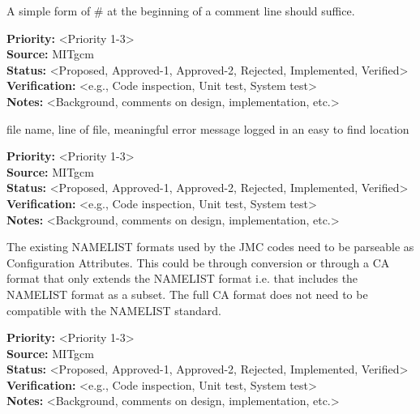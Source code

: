 



A simple form of # at the beginning of a comment line
should suffice.

\begin{reqlist}
{\bf Priority:} <Priority 1-3> \\
{\bf Source:} MITgcm \\
{\bf Status:} <Proposed, Approved-1, Approved-2, Rejected, Implemented, Verified> \\
{\bf Verification:} <e.g., Code inspection, Unit test, System test> \\
{\bf Notes:} <Background, comments on design, implementation, etc.> 
\end{reqlist}

file name, line of file, meaningful error message logged in an easy
to find location

\begin{reqlist}
{\bf Priority:} <Priority 1-3> \\
{\bf Source:} MITgcm \\
{\bf Status:} <Proposed, Approved-1, Approved-2, Rejected, Implemented, Verified> \\
{\bf Verification:} <e.g., Code inspection, Unit test, System test> \\
{\bf Notes:} <Background, comments on design, implementation, etc.> 
\end{reqlist}

The existing NAMELIST formats used by the JMC codes need to be parseable
as Configuration Attributes. This could be through conversion or through
a CA format that only extends the NAMELIST format i.e. that includes the
NAMELIST format as a subset.
The full CA format does not need to be compatible with the NAMELIST standard.
\begin{reqlist}
{\bf Priority:} <Priority 1-3> \\
{\bf Source:} MITgcm \\
{\bf Status:} <Proposed, Approved-1, Approved-2, Rejected, Implemented, Verified> \\
{\bf Verification:} <e.g., Code inspection, Unit test, System test> \\
{\bf Notes:} <Background, comments on design, implementation, etc.> 
\end{reqlist}

